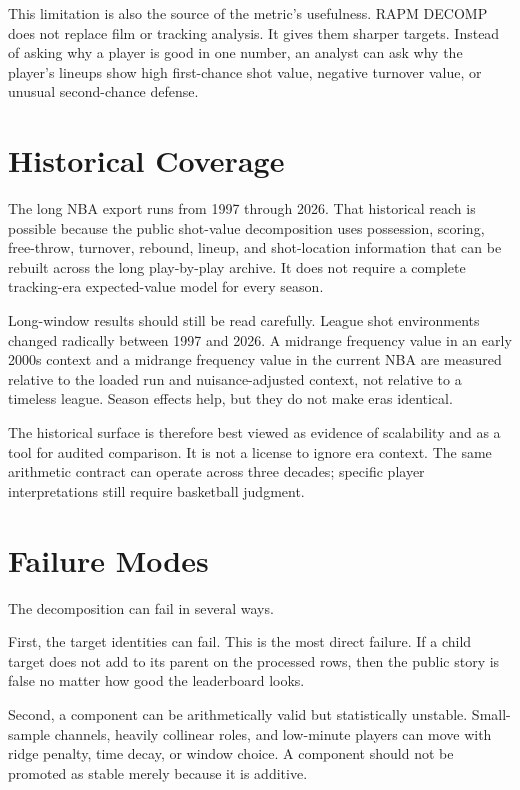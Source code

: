 \documentclass[11pt]{article}
\begin{document}
This limitation is also the source of the metric's usefulness.  RAPM DECOMP does
not replace film or tracking analysis.  It gives them sharper targets.  Instead
of asking why a player is good in one number, an analyst can ask why the player's
lineups show high first-chance shot value, negative turnover value, or unusual
second-chance defense.

\section{Historical Coverage}

The long NBA export runs from 1997 through 2026.  That historical reach is
possible because the public shot-value decomposition uses possession, scoring,
free-throw, turnover, rebound, lineup, and shot-location information that can be
rebuilt across the long play-by-play archive.  It does not require a complete
tracking-era expected-value model for every season.

Long-window results should still be read carefully.  League shot environments
changed radically between 1997 and 2026.  A midrange frequency value in an early
2000s context and a midrange frequency value in the current NBA are measured
relative to the loaded run and nuisance-adjusted context, not relative to a
timeless league.  Season effects help, but they do not make eras identical.

The historical surface is therefore best viewed as evidence of scalability and
as a tool for audited comparison.  It is not a license to ignore era context.
The same arithmetic contract can operate across three decades; specific player
interpretations still require basketball judgment.

\section{Failure Modes}

The decomposition can fail in several ways.

First, the target identities can fail.  This is the most direct failure.  If a
child target does not add to its parent on the processed rows, then the public
story is false no matter how good the leaderboard looks.

Second, a component can be arithmetically valid but statistically unstable.
Small-sample channels, heavily collinear roles, and low-minute players can move
with ridge penalty, time decay, or window choice.  A component should not be
promoted as stable merely because it is additive.
\end{document}
